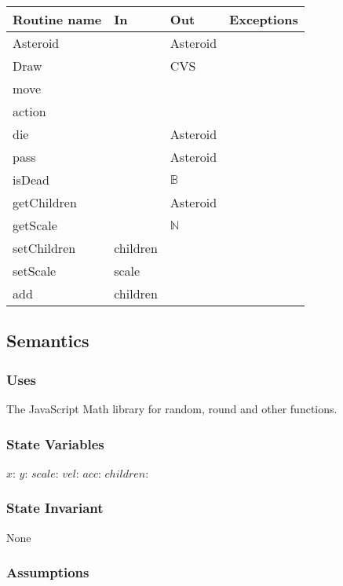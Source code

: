 \documentclass[12pt]{article}
\begin{document}
\newpage

\begin{tabular}{| l | l | l | l |}
    \hline
    \textbf{Routine name} & \textbf{In} & \textbf{Out} & \textbf{Exceptions}\\
    \hline
    Asteroid & ~ & Asteroid & ~\\
    \hline
    Draw & ~ & CVS & ~\\
    \hline
    move & ~ & ~ & ~\\
    \hline
    action & ~ & ~ & ~\\
    \hline
    die & ~ & Asteroid & ~\\
    \hline
    pass & ~ & Asteroid & ~\\
    \hline
    isDead & ~ & $\mathbb{B}$ & ~\\
    \hline
    getChildren & ~ & Asteroid & ~\\
    \hline
    getScale & ~ & $\mathbb{N}$ & ~\\
    \hline
    setChildren & children & ~ & ~\\
    \hline
    setScale & scale & ~ & ~\\
    \hline
    add & children & ~ & ~\\
    \hline
\end{tabular}

\subsection* {Semantics}

\subsubsection* {Uses}

The JavaScript Math library for random, round and other functions.

\subsubsection* {State Variables}

$x$:
$y$:
$scale$:
$vel$:
$acc$:
$children$:

\subsubsection* {State Invariant}

None

\subsubsection* {Assumptions}
\end{document}
